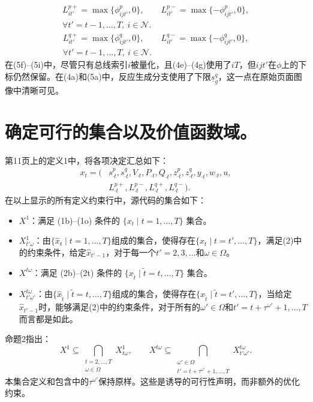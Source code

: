 \documentclass[10pt]{article}
\begin{document}
\begin{equation}
\begin{gathered}
L_{it'}^{p+}=\max\{\phi_{ijt'}^p,0\},\qquad L_{it'}^{p-}=\max\{-\phi_{ijt'}^p,0\},\\
\forall t'=t-1,\ldots,T,\ i\in\mathcal N.
\end{gathered}\tag{5h}
\end{equation}
\begin{equation}
\begin{gathered}
L_{it'}^{q+}=\max\{\phi_{ijt'}^q,0\},\qquad L_{it'}^{q-}=\max\{-\phi_{ijt'}^q,0\},\\
\forall t'=t-1,\ldots,T,\ i\in\mathcal N.
\end{gathered}\tag{5i}
\end{equation}
在(5f)--(5i)中，尽管只有总线索引$i$被量化，且(4e)--(4g)使用了$iT$，但$ijt'$在$\phi$上的下标仍然保留。在(4a)和(5a)中，反应生成分支使用了下限$\underline s_g^q$，这一点在原始页面图像中清晰可见。

\section*{确定可行的集合以及价值函数域。}
第11页上的定义1中，将各项决定汇总如下：
\[
\begin{aligned}
x_t=(&s_{\cdot t}^p,s_{\cdot t}^q,V_{\cdot t},P_{\cdot t},Q_{\cdot t},z_{\cdot t}^p,z_{\cdot t}^q,y_{\cdot t},w_{\cdot t},u,\\
&L_{\cdot t}^{p+},L_{\cdot t}^{p-},L_{\cdot t}^{q+},L_{\cdot t}^{q-}).
\end{aligned}
\]
在以上显示的所有定义约束行中，源代码的集合如下：
\begin{itemize}
\item $X^1$：满足 (1b)–(1o) 条件的 $\{x_t\mid t=1,\ldots,T\}$ 集合。
\item $X^1_{t'\omega}$：由$\{\hat x_t\mid t=1,\ldots,T\}$组成的集合，使得存在$\{x_t\mid t=t',\ldots,T\}$，满足(2)中的约束条件，给定$\hat x_{t'-1}$，对于每一个$t'=2,3,\ldots$和$\omega\in\Omega$。
\item $X^{t\omega}$：满足 (2b)–(2t) 条件的 $\{x_{\tilde t}\mid\tilde t=t,\ldots,T\}$ 集合。
\item $X^{t\omega}_{t'\omega'}$：由$\{\hat x_{\tilde t}\mid\tilde t=t,\ldots,T\}$组成的集合，使得存在$\{x_{\tilde t}\mid\tilde t=t',\ldots,T\}$，当给定$\hat x_{t'-1}$时，能够满足(2)中的约束条件，对于所有的$\omega'\in\Omega$和$t'=t+\tau^{\omega'}+1,\ldots,T$而言都是如此。
\end{itemize}
命题2指出：
\[
X^1\subseteq\bigcap_{\substack{t=2,\ldots,T\\\omega\in\Omega}}X^1_{t\omega},
\qquad
X^{t\omega}\subseteq\bigcap_{\substack{\omega'\in\Omega\\t'=t+\tau^{\omega'}+1,\ldots,T}}X^{t\omega}_{t'\omega'}.
\]
本集合定义和包含中的$\tau^{\omega'}$保持原样。这些是诱导的可行性声明，而非额外的优化约束。
\end{document}
